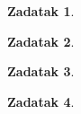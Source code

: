 \documentclass{article}
\newtheorem{exercise}{\Large Zadatak}
\begin{document}


\begin{exercise}
    
\end{exercise}

\newpage
\begin{exercise}
    
\end{exercise}

\newpage
\begin{exercise}
    
\end{exercise}

\newpage
\begin{exercise}
    
\end{exercise}
\end{document}
